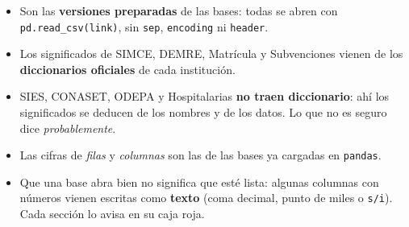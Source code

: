 \documentclass[10.5pt]{article}
\begin{document}
\begin{alertabox}[Importante]
\begin{itemize}[leftmargin=1.1em,itemsep=2pt,topsep=2pt]
\item Son las \textbf{versiones preparadas} de las bases: todas se abren con \texttt{pd.read\_\allowbreak{}csv(link)}, sin \texttt{sep}, \texttt{encoding} ni \texttt{header}.
\item Los significados de SIMCE, DEMRE, Matrícula y Subvenciones vienen de los \textbf{diccionarios oficiales} de cada institución.
\item SIES, CONASET, ODEPA y Hospitalarias \textbf{no traen diccionario}: ahí los significados se deducen de los nombres y de los datos. Lo que no es seguro dice \emph{probablemente}.
\item Las cifras de \emph{filas} y \emph{columnas} son las de las bases ya cargadas en \texttt{pandas}.
\item Que una base abra bien no significa que esté lista: algunas columnas con números vienen escritas como \textbf{texto} (coma decimal, punto de miles o \texttt{s/\allowbreak{}i}). Cada sección lo avisa en su caja roja.
\end{itemize}
\end{alertabox}

\newpage
{}\label{base1}\hypertarget{base1}{}
\end{document}
